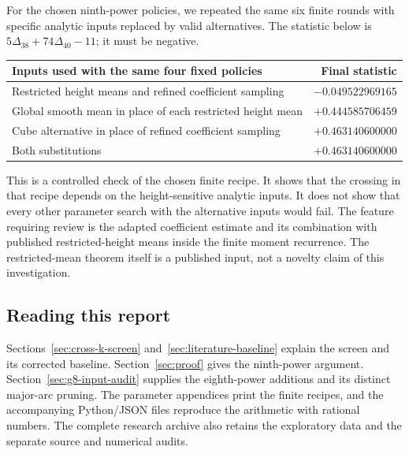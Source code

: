 \documentclass[11pt,letterpaper]{article}
\numberwithin{equation}{section}
\begin{document}
For the chosen ninth-power policies, we repeated the same six finite rounds
with specific analytic inputs replaced by valid alternatives. The statistic
below is $5\Delta_{38}+74\Delta_{40}-11$; it must be negative.

\begin{center}
\small
\begin{tabular}{lr}
\toprule
Inputs used with the same four fixed policies & Final statistic\\
\midrule
Restricted height means and refined coefficient sampling & $-0.049522969165$\\
Global smooth mean in place of each restricted height mean & $+0.444585706459$\\
Cube alternative in place of refined coefficient sampling & $+0.463140600000$\\
Both substitutions & $+0.463140600000$\\
\bottomrule
\end{tabular}
\end{center}

This is a controlled check of the chosen finite recipe. It shows that the
crossing in that recipe depends on the height-sensitive analytic inputs.
It does not show that every other parameter search with the alternative
inputs would fail. The feature requiring review is the adapted coefficient
estimate and its combination with published restricted-height means inside
the finite moment recurrence. The restricted-mean theorem itself is a
published input, not a novelty claim of this investigation.

\subsection{Reading this report}

Sections~\ref{sec:cross-k-screen} and~\ref{sec:literature-baseline} explain
the screen and its corrected baseline. Section~\ref{sec:proof} gives the
ninth-power argument. Section~\ref{sec:g8-input-audit} supplies the
eighth-power additions and its distinct major-arc pruning. The parameter
appendices print the finite recipes, and the accompanying Python/JSON
files reproduce the arithmetic with rational numbers. The complete
research archive also retains the exploratory data and the separate source
and numerical audits.

\par\bigskip{}

\end{document}

